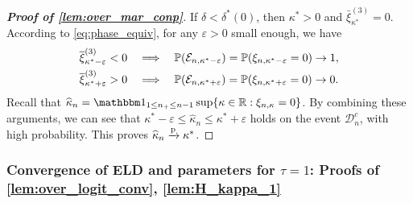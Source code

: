 \begin{proof}[\textbf{Proof of \cref{lem:over_mar_conp}}]
If $\delta < \delta^*(0)$, then $\kappa^* > 0$ and $\bar\xi_{\kappa^*}^{(3)} = 0$. According to \cref{eq:phase_equiv}, for any $\varepsilon > 0$ small enough, we have
\begin{equation*}
    \begin{aligned}
        \bar\xi_{\kappa^* - \varepsilon}^{(3)} < 0
    \quad & \Longrightarrow \quad
    \P(\mathcal{E}_{n, \kappa^* - \varepsilon}) = \P(\xi_{n, \kappa^* - \varepsilon} = 0) \to 1, \\
        \bar\xi_{\kappa^* + \varepsilon}^{(3)} > 0
    \quad & \Longrightarrow \quad
    \P(\mathcal{E}_{n, \kappa^* + \varepsilon}) = \P(\xi_{n, \kappa^* + \varepsilon} = 0) \to 0.
    \end{aligned}
\end{equation*}
Recall that $\hat\kappa_n = \ind_{1 \le n_+ \le n - 1} \sup\{ \kappa \in \R:  \xi_{n,\kappa} = 0 \}$.
By combining these arguments, we can see that $\kappa^* - \varepsilon \le \hat\kappa_n \le \kappa^* + \varepsilon$ holds on the event $\mathcal{D}_n^c$, with high probability. This proves $\hat\kappa_n \conp \kappa^*$.
\end{proof}

\subsubsection{Convergence of ELD and parameters for $\tau = 1$: 
Proofs of \cref{lem:over_logit_conv}, \ref{lem:H_kappa_1}}
\label{subsubsec:over_logit_conv}

